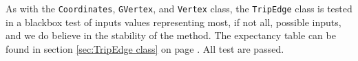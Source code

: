 As with the \texttt{Coordinates}, \texttt{GVertex}, and \texttt{Vertex} class, the \texttt{TripEdge} class is tested in a blackbox test of inputs values representing most, if not all, possible inputs, and we do believe in the stability of the method. The expectancy table can be found in section \ref{sec:TripEdge class} on page \pageref{sec:TripEdge class}. All test are passed.